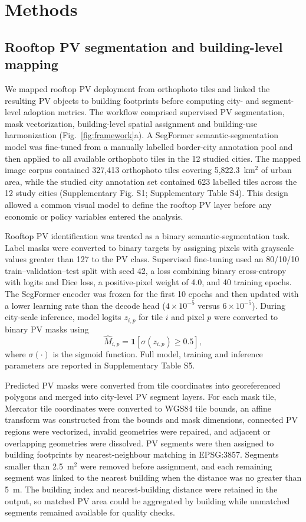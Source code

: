 \documentclass[pdflatex,sn-nature]{sn-jnl}
\begin{document}
\section{Methods}

\subsection{Rooftop PV segmentation and building-level mapping}

We mapped rooftop PV deployment from orthophoto tiles and linked the resulting PV objects to building footprints before computing city- and segment-level adoption metrics. The workflow comprised supervised PV segmentation, mask vectorization, building-level spatial assignment and building-use harmonization (Fig.~\ref{fig:framework}a). A SegFormer semantic-segmentation model was fine-tuned from a manually labelled border-city annotation pool and then applied to all available orthophoto tiles in the 12 studied cities. The mapped image corpus contained 327,413 orthophoto tiles covering 5,822.3~km$^{2}$ of urban area, while the studied city annotation set contained 623 labelled tiles across the 12 study cities (Supplementary Fig. S1; Supplementary Table S4). This design allowed a common visual model to define the rooftop PV layer before any economic or policy variables entered the analysis.

Rooftop PV identification was treated as a binary semantic-segmentation task. Label masks were converted to binary targets by assigning pixels with grayscale values greater than 127 to the PV class. Supervised fine-tuning used an 80/10/10 train--validation--test split with seed 42, a loss combining binary cross-entropy with logits and Dice loss, a positive-pixel weight of 4.0, and 40 training epochs. The SegFormer encoder was frozen for the first 10 epochs and then updated with a lower learning rate than the decode head ($4\times10^{-5}$ versus $6\times10^{-5}$). During city-scale inference, model logits $z_{i,p}$ for tile $i$ and pixel $p$ were converted to binary PV masks using
\begin{equation}
\hat{M}_{i,p}=\mathbf{1}\left[\sigma(z_{i,p})\geq0.5\right],
\end{equation}
where $\sigma(\cdot)$ is the sigmoid function. Full model, training and inference parameters are reported in Supplementary Table S5.

Predicted PV masks were converted from tile coordinates into georeferenced polygons and merged into city-level PV segment layers. For each mask tile, Mercator tile coordinates were converted to WGS84 tile bounds, an affine transform was constructed from the bounds and mask dimensions, connected PV regions were vectorized, invalid geometries were repaired, and adjacent or overlapping geometries were dissolved. PV segments were then assigned to building footprints by nearest-neighbour matching in EPSG:3857. Segments smaller than 2.5~m$^{2}$ were removed before assignment, and each remaining segment was linked to the nearest building when the distance was no greater than 5~m. The building index and nearest-building distance were retained in the output, so matched PV area could be aggregated by building while unmatched segments remained available for quality checks.
\end{document}
